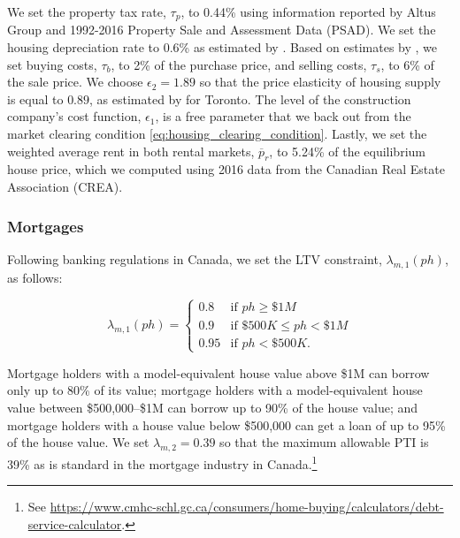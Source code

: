 \documentclass[parskip=full]{article}
\begin{document}
We set the property tax rate, $\tau_p$, to 0.44\% using information reported by Altus Group and 1992-2016 Property Sale and Assessment Data (PSAD). We set the housing depreciation rate to 0.6\% as estimated by \citet{rosenthal-2014}. Based on estimates by \citet{gm-2003}, we set buying costs, $\tau_{b}$, to 2\% of the purchase price, and selling costs, $\tau_{s}$, to 6\% of the sale price. We choose $\epsilon_{2}=1.89$ so that the price elasticity of housing supply is equal to $0.89$, as estimated by \citet{piaxao-2021} for Toronto. The level of the construction company's cost function, $\epsilon_1$, is a free parameter that we back out from the market clearing condition \eqref{eq:housing_clearing_condition}. Lastly, we set the weighted average rent in both rental markets, $\overline{p}_{r}$, to 5.24\% of the equilibrium house price, which we computed using 2016 data from the Canadian Real Estate Association (CREA).

\subsubsection{Mortgages}

Following banking regulations in Canada, we set the LTV constraint, $\lambda_{m,1}(ph)$, as follows:

\begin{equation*}
\lambda_{m,1}(ph) = \begin{cases}
0.8 &\text{if $ph\geq \$1M$}\\
0.9 &\text{if $\$500K\leq ph< \$1M$}\\
0.95 &\text{if $ph < \$500K$}.
\end{cases}
\end{equation*}

\noindent Mortgage holders with a model-equivalent house value above \$1M can borrow only up to 80\% of its value; mortgage holders with a model-equivalent house value between \$500,000--\$1M can borrow up to 90\% of the house value; and mortgage holders with a house value below \$500,000 can get a loan of up to 95\% of the house value. We set $\lambda_{m,2}=0.39$ so that the maximum allowable PTI is 39\% as is standard in the mortgage industry in Canada.\footnote{See \url{https://www.cmhc-schl.gc.ca/consumers/home-buying/calculators/debt-service-calculator}.}
\end{document}
